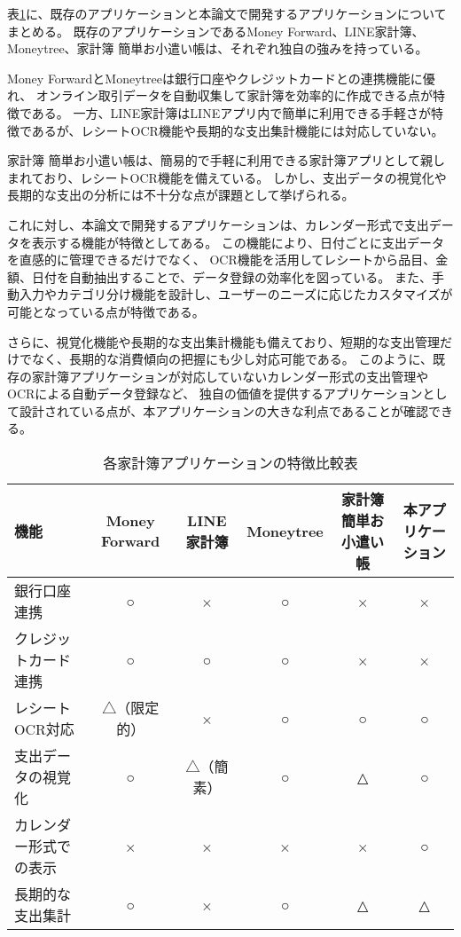 \documentclass[main]{subfiles}
\begin{document}
表\ref{tab:featureComparisonKakeibo}に、既存のアプリケーションと本論文で開発するアプリケーションについてまとめる。
既存のアプリケーションであるMoney Forward、LINE家計簿、Moneytree、家計簿 簡単お小遣い帳は、それぞれ独自の強みを持っている。

Money ForwardとMoneytreeは銀行口座やクレジットカードとの連携機能に優れ、
オンライン取引データを自動収集して家計簿を効率的に作成できる点が特徴である。
一方、LINE家計簿はLINEアプリ内で簡単に利用できる手軽さが特徴であるが、レシートOCR機能や長期的な支出集計機能には対応していない。

家計簿 簡単お小遣い帳は、簡易的で手軽に利用できる家計簿アプリとして親しまれており、レシートOCR機能を備えている。
しかし、支出データの視覚化や長期的な支出の分析には不十分な点が課題として挙げられる。

これに対し、本論文で開発するアプリケーションは、カレンダー形式で支出データを表示する機能が特徴としてある。
この機能により、日付ごとに支出データを直感的に管理できるだけでなく、
OCR機能を活用してレシートから品目、金額、日付を自動抽出することで、データ登録の効率化を図っている。
また、手動入力やカテゴリ分け機能を設計し、ユーザーのニーズに応じたカスタマイズが可能となっている点が特徴である。

さらに、視覚化機能や長期的な支出集計機能も備えており、短期的な支出管理だけでなく、長期的な消費傾向の把握にも少し対応可能である。
このように、既存の家計簿アプリケーションが対応していないカレンダー形式の支出管理やOCRによる自動データ登録など、
独自の価値を提供するアプリケーションとして設計されている点が、本アプリケーションの大きな利点であることが確認できる。

\begin{table}[tbp]
    \centering
    \caption{各家計簿アプリケーションの特徴比較表}
    \label{tab:featureComparisonKakeibo}
    \small
    \begin{tabular}{|l|c|c|c|c|c|}
        \hline
        \textbf{機能} & \textbf{Money Forward} & \textbf{LINE家計簿} & \textbf{Moneytree} & \textbf{家計簿 簡単お小遣い帳} & \textbf{本アプリケーション} \\
        \hline
        銀行口座連携 & ○ & × & ○ & × & × \\
        \hline
        クレジットカード連携 & ○ & ○ & ○ & × & × \\
        \hline
        レシートOCR対応 & △（限定的） & × & ○ & ○ & ○ \\
        \hline
        支出データの視覚化 & ○ & △（簡素） & ○ & △ & ○ \\
        \hline
        カレンダー形式での表示 & × & × & × & × & ○ \\
        \hline
        長期的な支出集計 & ○ & × & ○ & △ & △ \\
        \hline
    \end{tabular}
\end{table}
\end{document}
